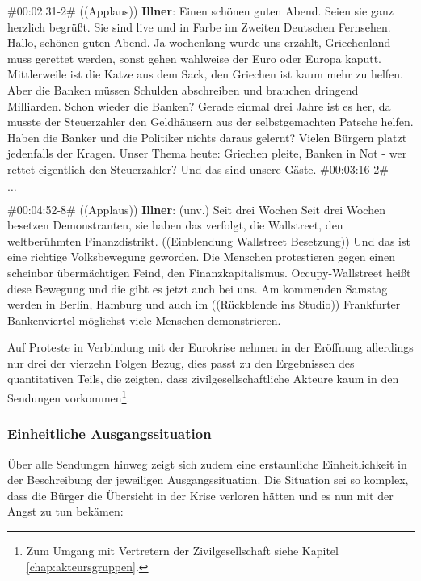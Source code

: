 \begin{description}
	\begin{linenumbers}[1]
		\item \#00:02:31-2\# ((Applaus)) \textbf{Illner}: Einen schönen guten Abend. Seien sie ganz herzlich begrüßt. Sie sind live und in Farbe im Zweiten Deutschen Fernsehen. Hallo, schönen guten Abend. Ja wochenlang wurde uns erzählt, Griechenland muss gerettet werden, sonst gehen wahlweise der Euro oder Europa kaputt. Mittlerweile ist die Katze aus dem Sack, den Griechen ist kaum mehr zu helfen. Aber die Banken müssen Schulden abschreiben und brauchen dringend Milliarden. Schon wieder die Banken? Gerade einmal drei Jahre ist es her, da musste der Steuerzahler den Geldhäusern aus der selbstgemachten Patsche helfen. Haben die Banker und die Politiker nichts daraus gelernt? Vielen Bürgern platzt jedenfalls der Kragen. Unser Thema heute: Griechen pleite, Banken in Not - wer rettet eigentlich den Steuerzahler? Und das sind unsere Gäste. \#00:03:16-2\#
		\item [$\ldots$]
		\item \#00:04:52-8\# ((Applaus)) \textbf{Illner}: (unv.) Seit drei Wochen Seit drei Wochen besetzen Demonstranten, sie haben das verfolgt, die Wallstreet, den weltberühmten Finanzdistrikt. ((Einblendung Wallstreet Besetzung)) Und das ist eine richtige Volksbewegung geworden. Die Menschen protestieren gegen einen scheinbar übermächtigen Feind, den Finanzkapitalismus. Occupy-Wallstreet heißt diese Bewegung und die gibt es jetzt auch bei uns. Am kommenden Samstag werden in Berlin, Hamburg und auch im ((Rückblende ins Studio)) Frankfurter Bankenviertel möglichst viele Menschen demonstrieren. 
	\end{linenumbers}
\end{description}

Auf Proteste in Verbindung mit der Eurokrise nehmen in der Eröffnung allerdings nur drei der vierzehn Folgen Bezug, dies passt zu den Ergebnissen des quantitativen Teils, die zeigten, dass zivilgesellschaftliche Akteure kaum in den Sendungen vorkommen\footnote{Zum Umgang mit Vertretern der Zivilgesellschaft siehe Kapitel \vref{chap:akteursgruppen}.}.

\subsubsection{Einheitliche Ausgangssituation}

Über alle Sendungen hinweg zeigt sich zudem eine erstaunliche Einheitlichkeit in der Beschreibung der jeweiligen Ausgangssituation. Die Situation sei so komplex, dass die Bürger die Übersicht in der Krise verloren hätten und es nun mit der Angst zu tun bekämen:

